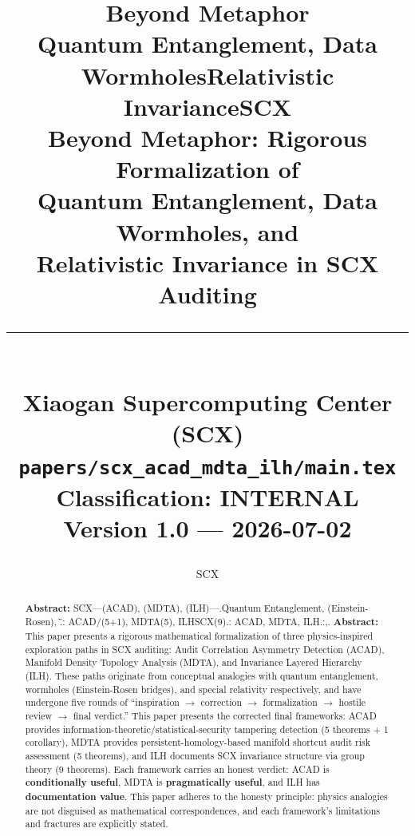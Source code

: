 \documentclass[11pt,a4paper]{article}
\theoremstyle{plain}
\theoremstyle{definition}
\theoremstyle{remark}
\begin{document}
\title{
 \vspace{2cm}
 {\Huge \textbf{Beyond Metaphor}}\\[0.2cm]
 {\LARGE Quantum Entanglement, Data WormholesRelativistic InvarianceSCX}\\[0.5cm]
 {\large \textcolor{scxblue}{Beyond Metaphor: Rigorous Formalization of}}\\[0.1cm]
 {\large \textcolor{scxblue}{Quantum Entanglement, Data Wormholes, and}}\\[0.1cm]
 {\large \textcolor{scxblue}{Relativistic Invariance in SCX Auditing}}\\[1cm]
 \rule{\textwidth}{1.5pt}\\[0.5cm]
 {\normalsize Xiaogan Supercomputing Center (SCX)}\\[0.2cm]
 {\small \texttt{papers/scx\_acad\_mdta\_ilh/main.tex}}\\[0.2cm]
 {\small Classification: INTERNAL}\\[0.2cm]
 {\small Version 1.0 --- 2026-07-02}
 \vspace{1cm}
\author{SCX}
\date{}
\maketitle
\thispagestyle{empty}
\begin{abstract}
\noindent
\textbf{Abstract: } SCX---(ACAD), (MDTA), (ILH)---.Quantum Entanglement, (Einstein-Rosen), \"\".: ACAD/(5+1), MDTA(5), ILHSCX(9).: ACAD, MDTA, ILH.:,.
\bigskip
\noindent
\textbf{Abstract:} This paper presents a rigorous mathematical formalization of three physics-inspired exploration paths in SCX auditing: Audit Correlation Asymmetry Detection (ACAD), Manifold Density Topology Analysis (MDTA), and Invariance Layered Hierarchy (ILH). These paths originate from conceptual analogies with quantum entanglement, wormholes (Einstein-Rosen bridges), and special relativity respectively, and have undergone five rounds of ``inspiration $\rightarrow$ correction $\rightarrow$ formalization $\rightarrow$ hostile review $\rightarrow$ final verdict.'' This paper presents the corrected final frameworks: ACAD provides information-theoretic/statistical-security tampering detection (5 theorems + 1 corollary), MDTA provides persistent-homology-based manifold shortcut audit risk assessment (5 theorems), and ILH documents SCX invariance structure via group theory (9 theorems). Each framework carries an honest verdict: ACAD is \textbf{conditionally useful}, MDTA is \textbf{pragmatically useful}, and ILH has \textbf{documentation value}. This paper adheres to the honesty principle: physics analogies are not disguised as mathematical correspondences, and each framework's limitations and fractures are explicitly stated.

\end{abstract}}
\end{document}
